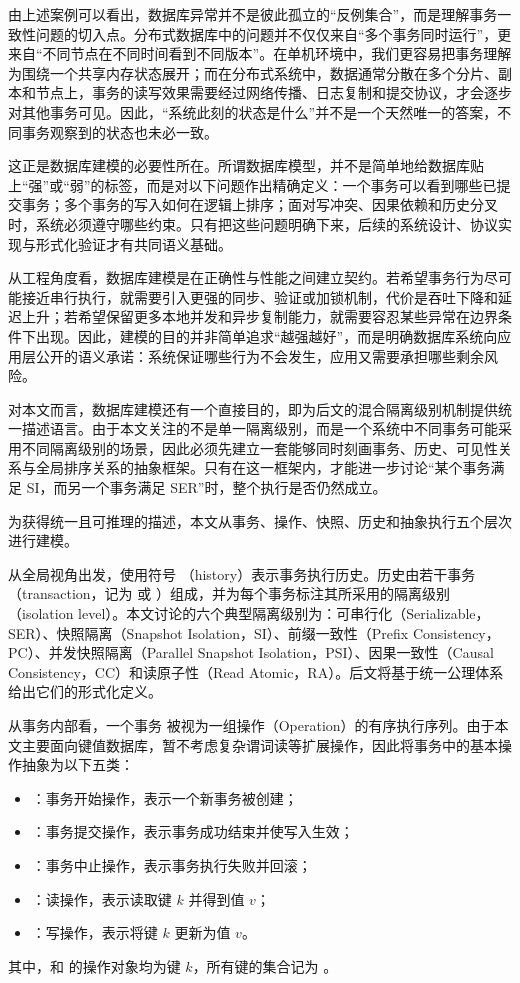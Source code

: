 由上述案例可以看出，数据库异常并不是彼此孤立的“反例集合”，而是理解事务一致性问题的切入点。分布式数据库中的问题并不仅仅来自“多个事务同时运行”，更来自“不同节点在不同时间看到不同版本”。在单机环境中，我们更容易把事务理解为围绕一个共享内存状态展开；而在分布式系统中，数据通常分散在多个分片、副本和节点上，事务的读写效果需要经过网络传播、日志复制和提交协议，才会逐步对其他事务可见。因此，“系统此刻的状态是什么”并不是一个天然唯一的答案，不同事务观察到的状态也未必一致。

这正是数据库建模的必要性所在。所谓数据库模型，并不是简单地给数据库贴上“强”或“弱”的标签，而是对以下问题作出精确定义：一个事务可以看到哪些已提交事务；多个事务的写入如何在逻辑上排序；面对写冲突、因果依赖和历史分叉时，系统必须遵守哪些约束。只有把这些问题明确下来，后续的系统设计、协议实现与形式化验证才有共同语义基础。

从工程角度看，数据库建模是在正确性与性能之间建立契约。若希望事务行为尽可能接近串行执行，就需要引入更强的同步、验证或加锁机制，代价是吞吐下降和延迟上升；若希望保留更多本地并发和异步复制能力，就需要容忍某些异常在边界条件下出现。因此，建模的目的并非简单追求“越强越好”，而是明确数据库系统向应用层公开的语义承诺：系统保证哪些行为不会发生，应用又需要承担哪些剩余风险。

对本文而言，数据库建模还有一个直接目的，即为后文的混合隔离级别机制提供统一描述语言。由于本文关注的不是单一隔离级别，而是一个系统中不同事务可能采用不同隔离级别的场景，因此必须先建立一套能够同时刻画事务、历史、可见性关系与全局排序关系的抽象框架。只有在这一框架内，才能进一步讨论“某个事务满足 SI，而另一个事务满足 SER”时，整个执行是否仍然成立。

为获得统一且可推理的描述，本文从事务、操作、快照、历史和抽象执行五个层次进行建模。

从全局视角出发，使用符号 \History（history）表示事务执行历史。历史由若干事务（transaction，记为 \Txc 或 \Txc[x]）组成，并为每个事务标注其所采用的隔离级别（isolation level）。本文讨论的六个典型隔离级别为：可串行化（Serializable，SER）、快照隔离（Snapshot Isolation，SI）、前缀一致性（Prefix Consistency，PC）、并发快照隔离（Parallel Snapshot Isolation，PSI）、因果一致性（Causal Consistency，CC）和读原子性（Read Atomic，RA）\cite{Schultz2015}。后文将基于统一公理体系给出它们的形式化定义。

从事务内部看，一个事务 \Txc 被视为一组操作（Operation）的有序执行序列。由于本文主要面向键值数据库，暂不考虑复杂谓词读等扩展操作，因此将事务中的基本操作抽象为以下五类：
\begin{itemize}
    \item \OpStart：事务开始操作，表示一个新事务被创建；
    \item \OpCommit：事务提交操作，表示事务成功结束并使写入生效；
    \item \OpAbort：事务中止操作，表示事务执行失败并回滚；
    \item \OpRead[k][v]：读操作，表示读取键 $k$ 并得到值 $v$；
    \item \OpWrite[k][v]：写操作，表示将键 $k$ 更新为值 $v$。
\end{itemize}
其中，\OpRead 和 \OpWrite 的操作对象均为键 $k$，所有键的集合记为 \Keys。


